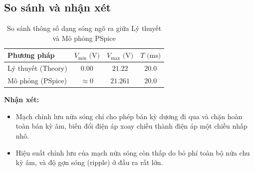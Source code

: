 \subsection{So sánh và nhận xét}
\begin{table}[H]
  \centering
  \caption{So sánh thông số dạng sóng ngõ ra giữa Lý thuyết và Mô phỏng PSpice}
  \begin{tabular}{lccc}
    \toprule
    \textbf{Phương pháp} & $V_{\min}\text{ (V)}$ & $V_{\max}\text{ (V)}$ & $T\text{ (ms)}$ \\
    \midrule
    Lý thuyết (Theory) & $0.00$  & $21.22$ & $20.0$ \\
    Mô phỏng (PSpice)  & $\approx 0$ & $21.261$ & $20.0$ \\
    \bottomrule
  \end{tabular}
\end{table}

\noindent\textbf{Nhận xét:}
\begin{itemize}[leftmargin=1.5em]
  \item Mạch chỉnh lưu nửa sóng chỉ cho phép bán kỳ dương đi qua và chặn hoàn toàn bán kỳ âm, biến đổi điện áp xoay chiều thành điện áp một chiều nhấp nhô.
  \item Hiệu suất chỉnh lưu của mạch nửa sóng còn thấp do bỏ phí toàn bộ nửa chu kỳ âm, và độ gợn sóng (ripple) ở đầu ra rất lớn.
\end{itemize}
